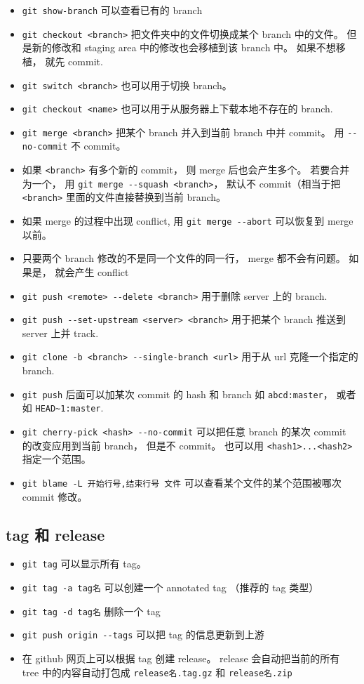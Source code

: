 \begin{itemize}
\item \verb|git show-branch| 可以查看已有的 branch 
\item \verb|git checkout <branch>| 把文件夹中的文件切换成某个 branch 中的文件。 但是新的修改和 staging area 中的修改也会移植到该 branch 中。 如果不想移植， 就先 commit.
\item \verb|git switch <branch>| 也可以用于切换 branch。
\item \verb|git checkout <name>| 也可以用于从服务器上下载本地不存在的 branch.
\item \verb|git merge <branch>| 把某个 branch 并入到当前 branch 中并 commit。 用 \verb|--no-commit| 不 commit。
\item 如果 \verb`<branch>` 有多个新的 commit， 则 merge 后也会产生多个。 若要合并为一个， 用 \verb`git merge --squash <branch>`， 默认不 commit（相当于把 \verb`<branch>` 里面的文件直接替换到当前 branch。
\item 如果 merge 的过程中出现 conflict, 用 \verb|git merge --abort| 可以恢复到 merge 以前。
\item 只要两个 branch 修改的不是同一个文件的同一行， merge 都不会有问题。 如果是， 就会产生 conflict



\item \verb|git push <remote> --delete <branch>| 用于删除 server 上的 branch.
\item \verb|git push --set-upstream <server> <branch>| 用于把某个 branch 推送到 server 上并 track.


\item \verb|git clone -b <branch> --single-branch <url>| 用于从 url 克隆一个指定的 branch.
\item \verb|git push| 后面可以加某次 commit 的 hash 和 branch 如 \verb|abcd:master|， 或者如 \verb|HEAD~1:master|.

\item \verb|git cherry-pick <hash> --no-commit| 可以把任意 branch 的某次 commit 的改变应用到当前 branch， 但是不 commit。 也可以用 \verb|<hash1>...<hash2>| 指定一个范围。
\item \verb|git blame -L 开始行号,结束行号 文件|  可以查看某个文件的某个范围被哪次 commit 修改。
\end{itemize}

\subsection{tag 和 release}
\begin{itemize}
\item \verb|git tag| 可以显示所有 tag。
\item \verb|git tag -a tag名| 可以创建一个 annotated tag （推荐的 tag 类型）
\item \verb|git tag -d tag名| 删除一个 tag
\item \verb|git push origin --tags| 可以把 tag 的信息更新到上游
\item 在 github 网页上可以根据 tag 创建 release。 release 会自动把当前的所有 tree 中的内容自动打包成 \verb|release名.tag.gz| 和 \verb|release名.zip|
\end{itemize}


